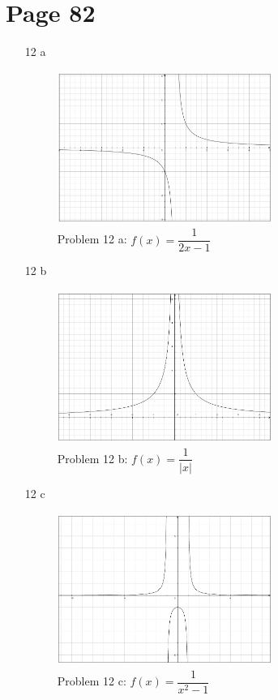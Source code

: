 \documentclass[fleqn,addpoints]{exam}
\begin{document}
\section{Page 82}
\begin{itemize}
\item[12 a]
\begin{figure}[H]
  \centering
  \includegraphics[width=7cm,height=5cm]{p82-12a.eps}
  \caption*{Problem 12 a: $f(x) = \dfrac{1}{2x-1}$}
\end{figure}

\item[12 b]
\begin{figure}[H]
  \centering
  \includegraphics[width=7cm,height=5cm]{p82-12b.eps}
  \caption*{Problem 12 b: $f(x) = \dfrac{1}{|x|}$}
\end{figure}

\item[12 c]
\begin{figure}[H]
  \centering
  \includegraphics[width=7cm,height=5cm]{p82-12c.eps}
  \caption*{Problem 12 c: $f(x) = \dfrac{1}{x^2-1}$}
\end{figure}


\end{itemize}
\end{document}
